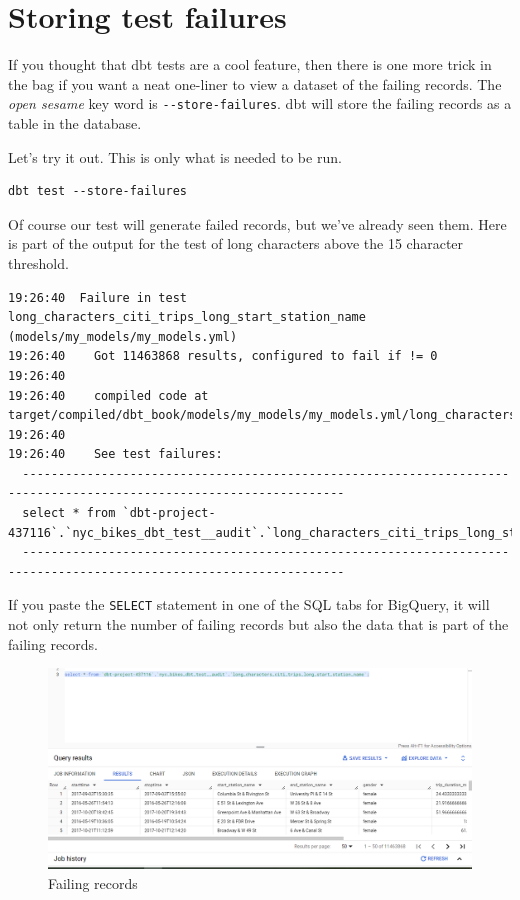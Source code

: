 \documentclass[
]{book}
\begin{document}
\hypertarget{storing-test-failures}{%
\section{Storing test failures}\label{storing-test-failures}}

If you thought that dbt tests are a cool feature, then there is one more trick in the bag if you want a neat one-liner to view a dataset of the failing records. The \emph{open sesame} key word is \texttt{-\/-store-failures}. dbt will store the failing records as a table in the database.

Let's try it out. This is only what is needed to be run.

\begin{verbatim}
dbt test --store-failures
\end{verbatim}

Of course our test will generate failed records, but we've already seen them. Here is part of the output for the test of long characters above the 15 character threshold.

\begin{verbatim}
19:26:40  Failure in test long_characters_citi_trips_long_start_station_name (models/my_models/my_models.yml)
19:26:40    Got 11463868 results, configured to fail if != 0
19:26:40  
19:26:40    compiled code at target/compiled/dbt_book/models/my_models/my_models.yml/long_characters_citi_trips_long_start_station_name.sql
19:26:40  
19:26:40    See test failures:
  -------------------------------------------------------------------------------------------------------------------
  select * from `dbt-project-437116`.`nyc_bikes_dbt_test__audit`.`long_characters_citi_trips_long_start_station_name`
  -------------------------------------------------------------------------------------------------------------------
\end{verbatim}

If you paste the \texttt{SELECT} statement in one of the SQL tabs for BigQuery, it will not only return the number of failing records but also the data that is part of the failing records.

\begin{figure}
\centering
\includegraphics{./images/failing_records.png}
\caption{Failing records}
\end{figure}
\end{document}
